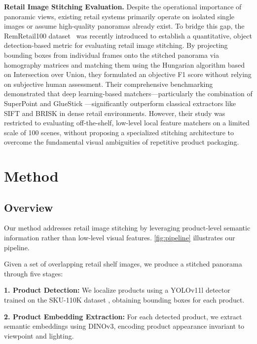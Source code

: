 \documentclass[10pt,twocolumn,letterpaper]{article}
\begin{document}
\noindent\textbf{Retail Image Stitching Evaluation.}
Despite the operational importance of panoramic views, existing retail systems primarily operate on isolated single images or assume high-quality panoramas already exist. To bridge this gap, the RemRetail100 dataset~\cite{image_stitching_eval} was recently introduced to establish a quantitative, object detection-based metric for evaluating retail image stitching. By projecting bounding boxes from individual frames onto the stitched panorama via homography matrices and matching them using the Hungarian algorithm based on Intersection over Union, they formulated an objective F1 score without relying on subjective human assessment. Their comprehensive benchmarking demonstrated that deep learning-based matchers---particularly the combination of SuperPoint \cite{DeTone_2018_CVPR_Workshops} and GlueStick \cite{Pautrat_2023_ICCV}---significantly outperform classical extractors like SIFT \cite{sift} and BRISK \cite{6126542} in dense retail environments. However, their study was restricted to evaluating off-the-shelf, low-level local feature matchers on a limited scale of 100 scenes, without proposing a specialized stitching architecture to overcome the fundamental visual ambiguities of repetitive product packaging.

\section{Method}
\label{sec:method}
\subsection{Overview}
\label{subsec:overview}

Our method addresses retail image stitching by leveraging product-level semantic information rather than low-level visual features. \cref{fig:pipeline} illustrates our pipeline.

Given a set of overlapping retail shelf images, we produce a stitched panorama through five stages:

\noindent\textbf{1. Product Detection:} We localize products using a YOLOv11l detector \cite{jocher_ultralytics_yolo_2023} trained on the SKU-110K dataset \cite{sku110k}, obtaining bounding boxes for each product.

\noindent\textbf{2. Product Embedding Extraction:} For each detected product, we extract semantic embeddings using DINOv3, encoding product appearance invariant to viewpoint and lighting.
\end{document}
